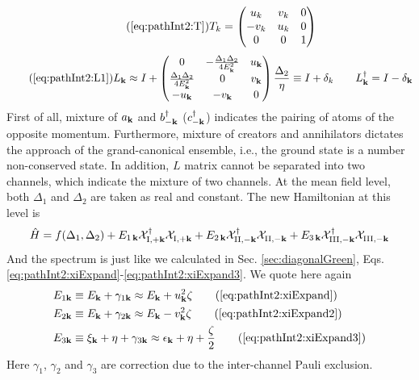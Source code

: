 \begin{equation}\tag{\ref{eq:pathInt2:T}}
T_k=\mtrx{u_k&v_k&0\\-v_k&u_k&0\\0&0&1}
\end{equation}
\begin{equation}\tag{\ref{eq:pathInt2:L1}}
L_{\vk}\approx{}I+
\mtrx{0&-\frac{\Delta_{1}{}\Delta_{2}{}}{4E^{2}_{\vk}}&u_{\vk}\\
\frac{\Delta_{1}{}\Delta_{2}{}}{4E^{2}_{\vk}}&0&v_{\vk}\\
-u_{\vk}&-v_{\vk}&0
}\frac{\Delta_{2}{}}{\eta}
\equiv{}I+\delta_{k}\qquad
L^{\dg}_{\vk}=I-\delta_{\vk}
\end{equation}
First of all, mixture of $a_{\mathbf{k}}$ and $b^{\dagger}_{-\mathbf{k}}$ ($c^{\dagger}_{-\mathbf{k}}$) indicates the pairing of atoms of the opposite momentum. Furthermore,   mixture of creators and annihilators dictates the approach of the grand-canonical ensemble, i.e., the ground state is a number non-conserved state.   In addition, $L$ matrix cannot be separated into two channels, which indicate the mixture of two channels.   At the mean field level, both $\Delta_{1}$ and $\Delta_{2}$ are taken as real and constant.  The new Hamiltonian at this level is 
\begin{equation}
\hat{H}=f(\Delta_{1},\Delta_{2})+E_{1\,\mathbf{k}}\mathcal{X}^{\dagger}_{\text{I},+\mathbf{k}}\mathcal{X}^{}_{\text{I},+\mathbf{k}}
+E_{2\,\mathbf{k}}\mathcal{X}^{\dagger}_{\text{II},-\mathbf{k}}\mathcal{X}^{}_{\text{II},-\mathbf{k}}
+E_{3\,\mathbf{k}}\mathcal{X}^{\dagger}_{\text{III},-\mathbf{k}}\mathcal{X}^{}_{\text{III},-\mathbf{k}}
\end{equation}
And the spectrum is just like we calculated in Sec. \ref{sec:diagonalGreen}, Eqs. \ref{eq:pathInt2:xiExpand}-\ref{eq:pathInt2:xiExpand3}.  We quote here again
\begin{align}
E_{1\vk}&\equiv{}E_{\vk}+\gamma_{1\vk}\approx{}E_{\vk}+u_{\vk}^{2}\zeta\tag{\ref{eq:pathInt2:xiExpand}}\\
E_{2\vk}&\equiv{}E_{\vk}+\gamma_{2\vk}
\approx{}E_{\vk}-v_{\vk}^{2}\zeta\tag{\ref{eq:pathInt2:xiExpand2}}\\
E_{3\vk}&\equiv{}\xi_{\vk}+\eta+\gamma_{3\vk}\approx{}\epsilon_{\vk}+\eta+\frac{\zeta}{2}
\tag{\ref{eq:pathInt2:xiExpand3}}
\end{align}
Here $\gamma_{1}$, $\gamma_{2}$ and $\gamma_{3}$ are correction due to the inter-channel Pauli exclusion. 

